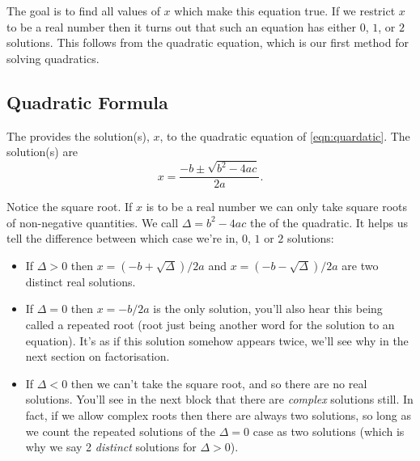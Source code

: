 \documentclass[fleqn]{LectureClass/LectureClass}
\begin{document}
    The goal is to find all values of \(x\) which make this equation true.
    If we restrict \(x\) to be a real number then it turns out that such an equation has either \(0\), \(1\), or \(2\) solutions.
    This follows from the quadratic equation, which is our first method for solving quadratics.
    
    \subsection{Quadratic Formula}
    The  provides the solution(s), \(x\), to the quadratic equation of \cref{eqn:quardatic}.
    The solution(s) are
    \begin{equation}
        x = \frac{-b \pm \sqrt{b^2 - 4ac}}{2a}.
    \end{equation}
    
    Notice the square root.
    If \(x\) is to be a real number we can only take square roots of non-negative quantities.
    We call \(\Delta = b^2 - 4ac\) the  of the quadratic.
    It helps us tell the difference between which case we're in, \(0\), \(1\) or \(2\) solutions:
    \begin{itemize}
        \item If \(\Delta > 0\) then \(x = (-b + \sqrt{\Delta})/2a\) and \(x = (-b - \sqrt{\Delta})/2a\) are two distinct real solutions.
        \item If \(\Delta = 0\) then \(x = -b/2a\) is the only solution, you'll also hear this being called a repeated root (root just being another word for the solution to an equation).
        It's as if this solution somehow appears twice, we'll see why in the next section on factorisation.
        \item If \(\Delta < 0\) then we can't take the square root, and so there are no real solutions.
        You'll see in the next block that there are \emph{complex} solutions still.
        In fact, if we allow complex roots then there are always two solutions, so long as we count the repeated solutions of the \(\Delta = 0\) case as two solutions (which is why we say 2 \emph{distinct} solutions for \(\Delta > 0\)).
    \end{itemize}
    
\end{document}

